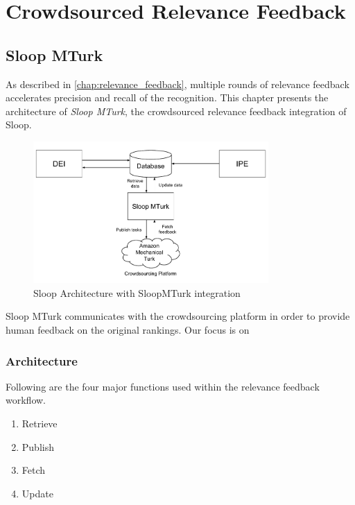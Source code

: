 \graphicspath{{./images/chap5/}}
\chapter{Crowdsourced Relevance Feedback}
\label{chap:sloop_mturk}
\section{Sloop MTurk}

As described in \ref{chap:relevance_feedback}, multiple rounds of relevance feedback accelerates precision and recall of the recognition. This chapter presents the architecture of \emph{Sloop MTurk}, the crowdsourced relevance feedback integration of Sloop. 

\begin{figure}[h]
  \centering
  \includegraphics[width=0.8\textwidth]{sloop/turk_system}
  \caption{Sloop Architecture with SloopMTurk integration}
  \label{fig:turk_overview}
\end{figure}

Sloop MTurk communicates with the crowdsourcing platform in order to provide human feedback on the original rankings. Our focus is on 

\subsection{Architecture}

Following are the four major functions used within the relevance feedback workflow.
\begin{enumerate}
	\item Retrieve
	\item Publish
	\item Fetch
	\item Update
\end{enumerate}


